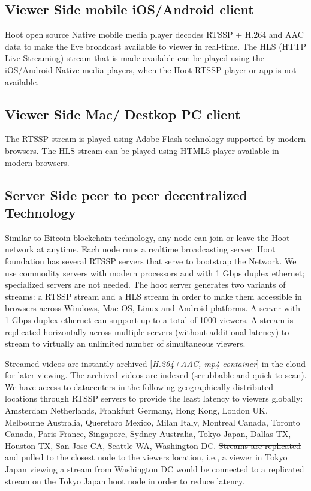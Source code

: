 \subsection{Viewer Side mobile iOS/Android client }
 Hoot open source Native mobile media player decodes RTSSP + H.264 and AAC data to make the live broadcast available to viewer in real-time. The HLS (HTTP Live Streaming) stream that is made available can be played using the iOS/Android Native media players, when the Hoot RTSSP player or app is not available.

\subsection{Viewer Side Mac/ Destkop PC client} 
The RTSSP stream is played using Adobe Flash technology supported by modern browsers. The HLS stream can be played using HTML5 player available in modern browsers.

\subsection{Server Side peer to peer decentralized Technology}
Similar to Bitcoin blockchain technology, any node can join or leave the Hoot network at anytime. Each node runs a realtime broadcasting server.
Hoot foundation has several RTSSP servers that serve to bootstrap the Network. We use commodity servers with modern processors and with 1 Gbps duplex ethernet; specialized servers are not needed. The hoot server generates two variants of streams: a RTSSP stream and a HLS stream in order to make them accessible in browsers across Windows, Mac OS, Linux and Android platforms. A server with 1 Gbps duplex ethernet can support up to a total of 1000 viewers. A stream is replicated horizontally across multiple servers (without additional latency) to stream to virtually an unlimited number of simultaneous viewers. 

Streamed videos are instantly archived [\emph{H.264+AAC, mp4 container}] in the cloud for later viewing. The archived videos are indexed (scrubbable and quick to scan). We have access to datacenters in the following geographically distributed locations through RTSSP servers to provide the least latency to viewers globally: Amsterdam Netherlands, Frankfurt Germany, Hong Kong, London UK, Melbourne Australia, Queretaro Mexico, Milan Italy, Montreal Canada, Toronto Canada, Paris France, Singapore, Sydney Australia, Tokyo Japan, Dallas TX, Houston TX, San Jose CA, Seattle WA, Washington DC. \sout{Streams are replicated and pulled to the closest node to the viewers location, i.e., a viewer in Tokyo Japan viewing a stream from Washington DC would be connected to a replicated stream on the Tokyo Japan hoot node in order to reduce latency.}

